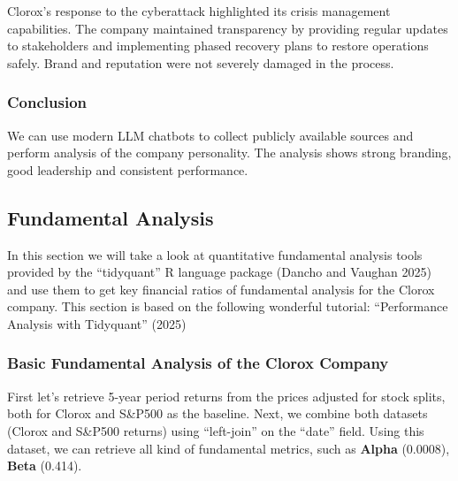 \documentclass[
  letterpaper,
  DIV=11,
  numbers=noendperiod]{scrartcl}
\begin{document}
Clorox's response to the cyberattack highlighted its crisis management
capabilities. The company maintained transparency by providing regular
updates to stakeholders and implementing phased recovery plans to
restore operations safely. Brand and reputation were not severely
damaged in the process.

\subsubsection{\texorpdfstring{\textbf{Conclusion}}{Conclusion}}\label{conclusion-1}

We can use modern LLM chatbots to collect publicly available sources and
perform analysis of the company personality. The analysis shows strong
branding, good leadership and consistent performance.

\subsection{Fundamental Analysis}\label{fundamental-analysis}

\begin{tcolorbox}[enhanced jigsaw, left=2mm, colback=white, opacityback=0, coltitle=black, arc=.35mm, leftrule=.75mm, bottomrule=.15mm, colbacktitle=quarto-callout-note-color!10!white, toptitle=1mm, title=\textcolor{quarto-callout-note-color}{\faInfo}\hspace{0.5em}{Note}, opacitybacktitle=0.6, bottomtitle=1mm, titlerule=0mm, breakable, rightrule=.15mm, toprule=.15mm, colframe=quarto-callout-note-color-frame]

In this section we will take a look at quantitative fundamental analysis
tools provided by the ``tidyquant'' R language package (Dancho and
Vaughan 2025) and use them to get key financial ratios of fundamental
analysis for the Clorox company. This section is based on the following
wonderful tutorial: {``Performance {Analysis} with Tidyquant''} (2025)

\end{tcolorbox}

\subsubsection{\texorpdfstring{\textbf{Basic Fundamental Analysis of the
Clorox
Company}}{Basic Fundamental Analysis of the Clorox Company}}\label{basic-fundamental-analysis-of-the-clorox-company}

First let's retrieve 5-year period returns from the prices adjusted for
stock splits, both for Clorox and S\&P500 as the baseline. Next, we
combine both datasets (Clorox and S\&P500 returns) using ``left-join''
on the ``date'' field. Using this dataset, we can retrieve all kind of
fundamental metrics, such as \textbf{Alpha} (0.0008), \textbf{Beta}
(0.414).
\end{document}
